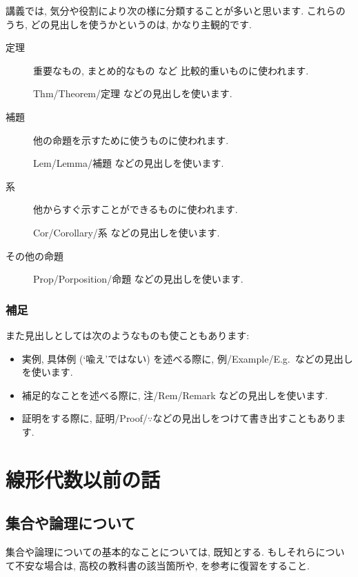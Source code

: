 講義では, 
気分や役割により次の様に分類することが多いと思います.
これらのうち, どの見出しを使うかというのは, 
かなり主観的です.
\begin{description}
\item[定理]
重要なもの, まとめ的なもの など 比較的重いものに使われます.

Thm/Theorem/定理  などの見出しを使います.

\item[補題]
他の命題を示すために使うものに使われます.

Lem/Lemma/補題  などの見出しを使います.

\item[系]
他からすぐ示すことができるものに使われます.

Cor/Corollary/系  などの見出しを使います.
\item[その他の命題]

Prop/Porposition/命題  などの見出しを使います.
\end{description}

\subsection{補足}
また見出しとしては次のようなものも使こともあります:
\begin{itemize}
 \item 
実例, 具体例 (`喩え'ではない) を述べる際に,
例/Example/E.g.\   などの見出しを使います.
\item
補足的なことを述べる際に,
注/Rem/Remark   などの見出しを使います.
\item
証明をする際に,
証明/Proof/$\because$などの見出しをつけて書き出すこともあります.
\end{itemize}
\tableofcontents


\renewcommand{\thesection}{\originalthesection}
\mainmatter

\chapter{線形代数以前の話}
\label{chap:prelim}

\section{集合や論理について}

集合や論理についての基本的なことについては,
既知とする.
もしそれらについて不安な場合は,
高校の教科書の該当箇所や,
\cite{978-4-535-78682-0}
を参考に復習をすること.

